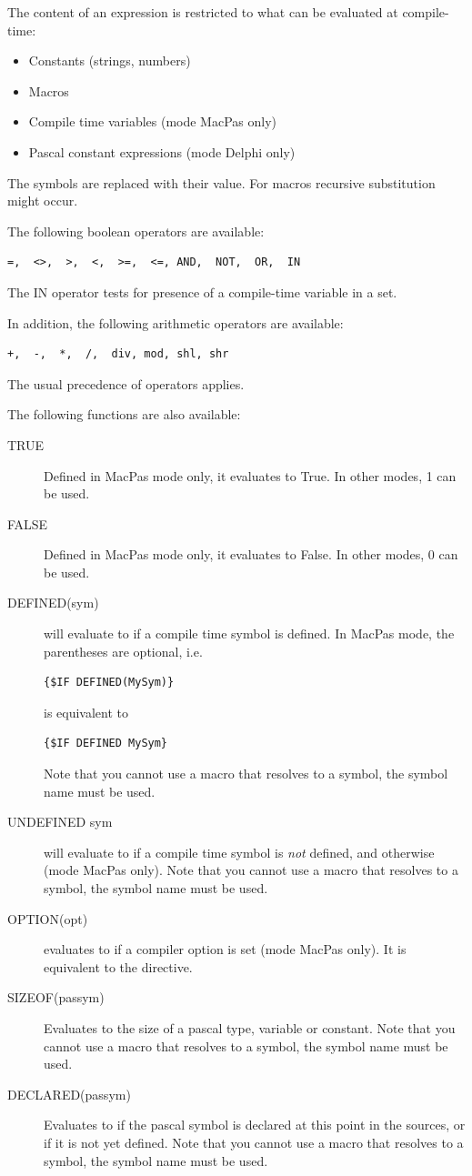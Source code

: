 The content of an expression is restricted to what can be evaluated at
compile-time:
\begin{itemize}
\item Constants (strings, numbers)
\item Macros
\item Compile time variables (mode MacPas only)
\item Pascal constant expressions (mode Delphi only)
\end{itemize}
The symbols are replaced with their value. For macros recursive substitution
might occur.

The following boolean operators are available:
\begin{verbatim}
=,  <>,  >,  <,  >=,  <=, AND,  NOT,  OR,  IN 
\end{verbatim}
The IN operator tests for presence of a compile-time variable in a set.

In addition, the following arithmetic operators are available:
\begin{verbatim}
+,  -,  *,  /,  div, mod, shl, shr
\end{verbatim}
The usual precedence of operators applies.

The following functions are also available:
\begin{description}
\item[TRUE] Defined in MacPas mode only, it evaluates to True. In other
modes, 1 can be used.
\item[FALSE] Defined in MacPas mode only, it evaluates to False. In other
modes, 0 can be used.
\item[DEFINED(sym)] will evaluate to  if a compile time symbol is
defined. In MacPas mode, the parentheses are optional, i.e. 
\begin{verbatim}
{$IF DEFINED(MySym)}
\end{verbatim}
is equivalent to 
\begin{verbatim}
{$IF DEFINED MySym}
\end{verbatim}
Note that you cannot use a macro that resolves to a symbol, the symbol name
must be used.
\item[UNDEFINED sym] will evaluate to  if a compile time symbol is {\em
not} defined, and  otherwise (mode MacPas only).
Note that you cannot use a macro that resolves to a symbol, the symbol name
must be used.
\item[OPTION(opt)] evaluates to  if a compiler option is set (mode MacPas
only). It is equivalent to the  directive.
\item[SIZEOF(passym)] Evaluates to the size of a pascal type, variable or
constant. Note that you cannot use a macro that resolves to a symbol, the symbol name
must be used.

\item[DECLARED(passym)] Evaluates to  if the pascal symbol is
declared at this point in the sources, or  if it is not yet
defined.
Note that you cannot use a macro that resolves to a symbol, the symbol name
must be used.
\end{description}

